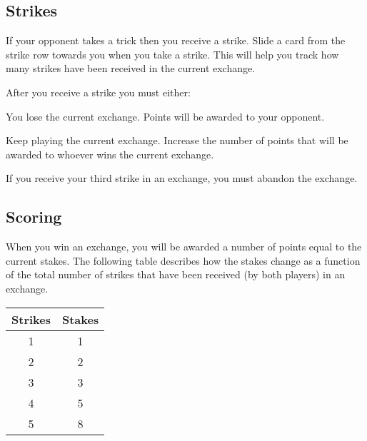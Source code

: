 \documentclass[a6paper, parskip=half, DIV=14, 10pt]{scrartcl}
\newcommand{\card}[1]{{\setmainfont{Roboto Slab} #1}}
\begin{document}
%

\newpage

\subsection*{Strikes}
If your opponent takes a trick then you receive a strike. Slide a card from the strike row towards you when you take a strike. This will help you track how many strikes have been received in the current exchange.


After you receive a strike you must either:
\begin{description}[leftmargin=0pt, labelsep=\widthof{\ }]
	\item[Abandon the Exchange \textendash] You lose the current exchange. Points will be awarded to your opponent.
	\item[Raise the Stakes \textendash] Keep playing the current exchange. Increase the number of points that will be awarded to whoever wins the current exchange.
\end{description}
If you receive your third strike in an exchange, you must abandon the exchange.

\newpage

\subsection*{Scoring}
When you win an exchange, you will be awarded a number of points equal to the current stakes. The following table describes how the stakes change as a function of the total number of strikes that have been received (by both players) in an exchange.

{
\setmainfont{Roboto Slab}
\begin{table}[h]
\centering
\begin{tabular}{cc} \toprule
\textbf{Strikes} & \textbf{Stakes} \\ \midrule
1 & 1\\
2 & 2\\
3 & 3\\
4 & 5\\
5 & 8 \\ \bottomrule
\end{tabular}
\end{table}
}
\end{document}
